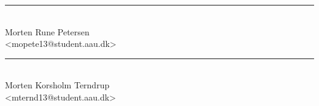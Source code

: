 \vspace{3\baselineskip}\noindent
\begin{minipage}[b]{0.45\textwidth}
 \centering
 \rule{\textwidth}{0.5pt}\\
  Morten Rune Petersen\\
 {\footnotesize <mopete13@student.aau.dk>}
\end{minipage}
\hfill
\begin{minipage}[b]{0.45\textwidth}
 \centering
 \rule{\textwidth}{0.5pt}\\
  Morten Korsholm Terndrup\\
 {\footnotesize <mternd13@student.aau.dk>}
\end{minipage}
